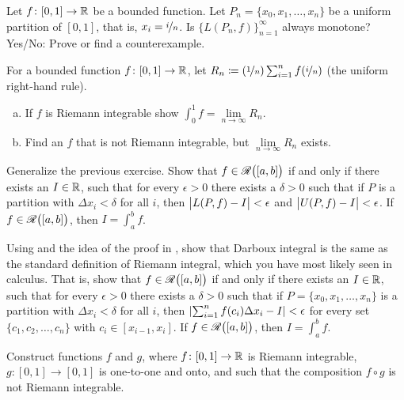 \begin{exercise}
Let $f \colon [0,1] \to {\mathbb{R}}$ be a bounded function.
Let $P_n = \{ x_0,x_1,\ldots,x_n \}$ be a uniform partition of $[0,1]$,
that is, $x_i = \nicefrac{i}{n}$.  Is $\bigl\{ L(P_n,f) \bigr\}_{n=1}^\infty$
always monotone?  Yes/No: Prove or find a counterexample.
\end{exercise}

\begin{exercise}[Challenging]
For a bounded function $f \colon [0,1] \to {\mathbb{R}}$, let
$R_n \coloneqq (\nicefrac{1}{n})\sum_{i=1}^n f(\nicefrac{i}{n})$ (the
uniform right-hand rule).
\begin{enumerate}[a)]
\item
If $f$ is Riemann integrable show $\int_0^1 f = \lim\limits_{n\to\infty} R_n$.
\item
Find an $f$ that is not Riemann integrable, but $\lim\limits_{n\to\infty} R_n$ exists.
\end{enumerate}
\end{exercise}

\begin{exercise}[Challenging] \label{exercise:riemannintdarboux}
Generalize the previous exercise.
Show that $f \in {\mathscr{R}}\bigl([a,b]\bigr)$ if and only if there exists an $I \in {\mathbb{R}}$,
such that for every $\epsilon > 0$ there exists
a $\delta > 0$ such that if $P$ is a partition with $\Delta x_i < \delta$
for all $i$, then
$\bigl\lvert {L(P,f) - I} \bigr\rvert < \epsilon$ and
$\bigl\lvert {U(P,f) - I} \bigr\rvert < \epsilon$.  If $f \in {\mathscr{R}}\bigl([a,b]\bigr)$, then $I = \int_a^b f$.
\end{exercise}

\begin{exercise}
Using  and the idea of
the proof in , show that 
Darboux integral is the same as the standard definition
of Riemann integral, which you have most likely seen in calculus.  That is,
show that
$f \in {\mathscr{R}}\bigl([a,b]\bigr)$ if and only if there exists an $I \in {\mathbb{R}}$,
such that for every $\epsilon > 0$ there exists
a $\delta > 0$ such that if $P = \{ x_0,x_1,\ldots,x_n \}$
is a partition with $\Delta x_i < \delta$
for all $i$, then
$\left\lvert {\sum_{i=1}^n f(c_i) \Delta x_i - I} \right\rvert < \epsilon$ for every set
$\{ c_1,c_2,\ldots,c_n \}$ with $c_i \in [x_{i-1},x_i]$.
If $f \in {\mathscr{R}}\bigl([a,b]\bigr)$, then $I = \int_a^b f$.
\end{exercise}


\begin{exercise}[Challenging]
Construct functions $f$ and $g$, 
where
$f \colon [0,1] \to {\mathbb{R}}$ is Riemann integrable,
$g \colon [0,1] \to [0,1]$ is one-to-one and onto,
and such that the composition $f \circ g$ is not Riemann integrable.
\end{exercise}


